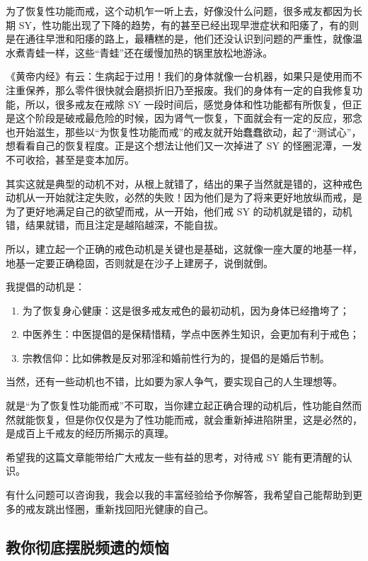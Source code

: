 \documentclass{ctexart}
\begin{document}
为了恢复性功能而戒，这个动机乍一听上去，好像没什么问题，很多戒友都因为长期 SY，性功能出现了下降的趋势，有的甚至已经出现早泄症状和阳痿了，有的则是在通往早泄和阳痿的路上，最糟糕的是，他们还没认识到问题的严重性，就像温水煮青蛙一样，这些“青蛙”还在缓慢加热的锅里放松地游泳。

《黄帝内经》有云：生病起于过用！我们的身体就像一台机器，如果只是使用而不注重保养，那么零件很快就会磨损折旧乃至报废。我们的身体有一定的自我修复功能，所以，很多戒友在戒除 SY 一段时间后，感觉身体和性功能都有所恢复，但正是这个阶段是破戒最危险的时候，因为肾气一恢复，下面就会有一定的反应，邪念也开始滋生，那些以“为恢复性功能而戒”的戒友就开始蠢蠢欲动，起了“测试心”，想看看自己的恢复程度。正是这个想法让他们又一次掉进了 SY 的怪圈泥潭，一发不可收拾，甚至是变本加厉。

其实这就是典型的动机不对，从根上就错了，结出的果子当然就是错的，这种戒色动机从一开始就注定失败，必然的失败！因为他们是为了将来更好地放纵而戒，是为了更好地满足自己的欲望而戒，从一开始，他们戒 SY 的动机就是错的，动机错，结果就错，而且注定是越陷越深，不能自拔。

所以，建立起一个正确的戒色动机是关键也是基础，这就像一座大厦的地基一样，地基一定要正确稳固，否则就是在沙子上建房子，说倒就倒。

我提倡的动机是：

\begin{enumerate}
    \item 为了恢复身心健康：这是很多戒友戒色的最初动机，因为身体已经撸垮了；
    \item 中医养生：中医提倡的是保精惜精，学点中医养生知识，会更加有利于戒色；
    \item 宗教信仰：比如佛教是反对邪淫和婚前性行为的，提倡的是婚后节制。
\end{enumerate}

当然，还有一些动机也不错，比如要为家人争气，要实现自己的人生理想等。

就是“为了恢复性功能而戒”不可取，当你建立起正确合理的动机后，性功能自然而然就能恢复，但是你仅仅是为了性功能而戒，就会重新掉进陷阱里，这是必然的，是成百上千戒友的经历所揭示的真理。

希望我的这篇文章能带给广大戒友一些有益的思考，对待戒 SY 能有更清醒的认识。

有什么问题可以咨询我，我会以我的丰富经验给予你解答，我希望自己能帮助到更多的戒友跳出怪圈，重新找回阳光健康的自己。

\subsection{教你彻底摆脱频遗的烦恼}
\end{document}
